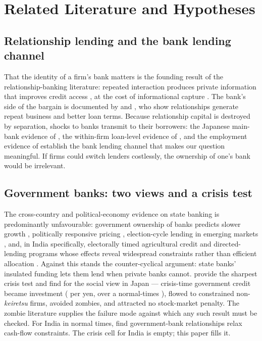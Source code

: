 \documentclass[12pt]{article}
\begin{document}
\section{Related Literature and Hypotheses}\label{sec:lit}

\subsection{Relationship lending and the bank lending channel}

That the identity of a firm's bank matters is the founding result of the relationship-banking
literature: repeated interaction produces private information that improves credit access
\citep{petersen1994}, at the cost of informational capture \citep{sharpe1990,rajan1992}.
The bank's side of the bargain is documented by \citet{bharath2007} and \citet{bharath2011},
who show relationships generate repeat business and better loan terms. Because relationship
capital is destroyed by separation, shocks to banks transmit to their borrowers: the
Japanese main-bank evidence of \citet{hoshi1991}, the within-firm loan-level evidence of
\citet{khwaja2008}, and the employment evidence of \citet{chodorowreich2014} establish the
bank lending channel that makes our question meaningful. If firms could switch lenders
costlessly, the ownership of one's bank would be irrelevant.

\subsection{Government banks: two views and a crisis test}

The cross-country and political-economy evidence on state banking is predominantly
unfavourable: government ownership of banks predicts slower growth \citep{laporta2002},
politically responsive pricing \citep{sapienza2004}, election-cycle lending in emerging
markets \citep{dinc2005}, and, in India specifically, electorally timed agricultural credit
\citep{cole2009} and directed-lending programs whose effects reveal widespread constraints
rather than efficient allocation \citep{banerjee2014}. Against this stands the
counter-cyclical argument: state banks' insulated funding lets them lend when private banks
cannot. \citet{lin2015government} provide the sharpest crisis test and find for the social
view in Japan --- crisis-time government credit became investment ( per yen,
over a normal-times ), flowed to constrained non-\emph{keiretsu} firms, avoided
zombies, and attracted no stock-market penalty. The zombie literature
\citep{peek2005,caballero2008} supplies the failure mode against which any such result must
be checked. For India in normal times, \citet{srinivasan2017} find government-bank
relationships relax cash-flow constraints. The crisis cell for India is empty; this paper
fills it.
\end{document}
